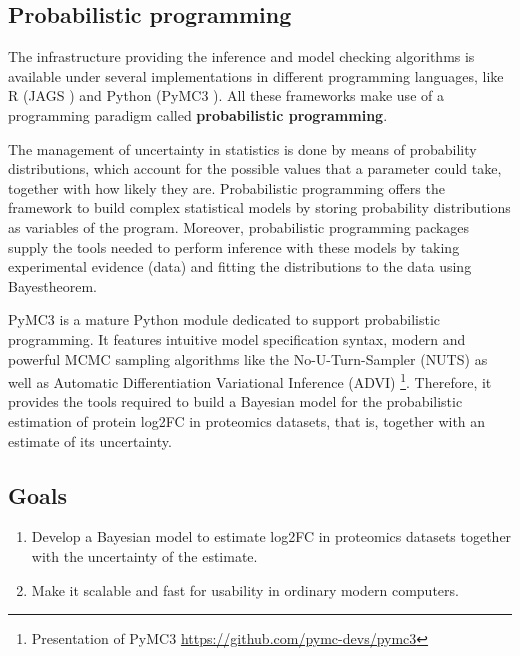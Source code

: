 \subsection{Probabilistic programming}

The infrastructure providing the inference and model checking algorithms is available under several implementations in different programming languages, like R (JAGS \cite{Plummer}) and Python (PyMC3 \cite{Salvatier2016}). All these frameworks make use of a programming paradigm called \textbf{probabilistic programming}.


The management of uncertainty in statistics is done by means of probability distributions, which account for the possible values that a parameter could take, together with how likely they are. Probabilistic programming offers the framework to build complex statistical models by storing probability distributions as variables of the program. Moreover, probabilistic programming packages supply the tools needed to perform inference with these models by taking experimental evidence (data) and fitting the distributions to the data using Bayes\textquotesingle theorem.


PyMC3 is a mature Python module dedicated to support probabilistic programming. It features   intuitive model specification syntax, modern and powerful \ac{MCMC} sampling algorithms like the No-U-Turn-Sampler (\ac{NUTS}) as well as Automatic Differentiation Variational Inference (ADVI) \footnote{Presentation of PyMC3 \href{https://github.com/pymc-devs/pymc3}{https://github.com/pymc-devs/pymc3}}. Therefore, it provides the tools required to build a Bayesian model for the probabilistic estimation of protein \ac{log2FC} in proteomics datasets, that is, together with an estimate of its uncertainty.


\subsection{Goals}

\begin{enumerate}

\item Develop a Bayesian model to estimate log2FC in proteomics datasets together with the uncertainty of the estimate.

\item Make it scalable and fast for usability in ordinary modern computers.

\end{enumerate}


